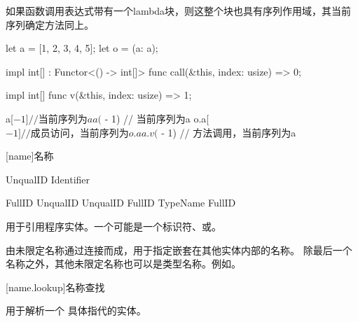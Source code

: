\pnum
如果函数调用表达式带有一个lambda块，则这整个块也具有序列作用域，其当前序列确定方法同上。

\enterexample

\begin{codeblock}
let a = [1, 2, 3, 4, 5];
let o = (a: a);

impl int[] : Functor<() -> int[]> {
    func call(&this, index: usize) => 0;
}

impl int[] {
    func v(&this, index: usize) => 1;
}

a[$ - 1] // 当前序列为a
a($ - 1) // 当前序列为a
o.a[$ - 1] // 成员访问，当前序列为o.a
a.v($ - 1) // 方法调用，当前序列为a

\end{codeblock}

\exitexample

[name]{名称}

\begin{bnf}{UnqualID}
    Identifier \br
     \br
\end{bnf}

\begin{bnf}{FullID}
    UnqualID \br
    UnqualID \terminal{::} FullID \br
    TypeName \terminal{::} FullID
\end{bnf}

\pnum
{}用于引用程序实体。一个可能是一个标识符、或。

\pnum
{}由未限定名称通过\tcode{::}连接而成，用于指定嵌套在其他实体内部的名称。
除最后一个名称之外，其他未限定名称也可以是类型名称。\enterexample 例如。\exitexample

[name.lookup]{名称查找}

\pnum
{}用于解析一个  具体指代的实体。
